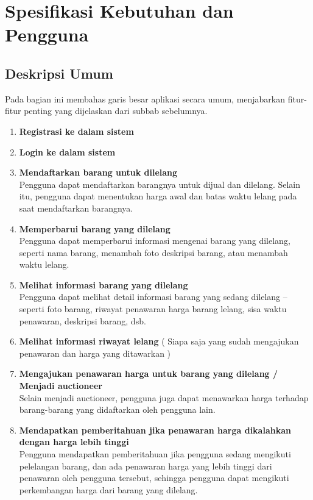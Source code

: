 \section{Spesifikasi Kebutuhan dan Pengguna}
   
  \subsection{Deskripsi Umum}
  
  Pada bagian ini membahas garis besar aplikasi secara umum, menjabarkan fitur-fitur penting yang dijelaskan dari subbab sebelumnya.  
  \begin{enumerate}
  \item \textbf{Registrasi ke dalam sistem}
    \item \textbf{Login ke dalam sistem}
    \item \textbf{Mendaftarkan barang untuk dilelang} \\
        Pengguna dapat mendaftarkan barangnya untuk dijual dan dilelang. Selain itu, pengguna dapat menentukan harga awal dan batas waktu lelang pada saat mendaftarkan barangnya.
    \item \textbf{Memperbarui barang yang dilelang} \\
        Pengguna dapat memperbarui informasi mengenai barang yang dilelang, seperti nama barang, menambah foto deskripsi barang, atau menambah waktu lelang.
    \item \textbf{Melihat informasi barang yang dilelang} \\
        Pengguna dapat melihat detail informasi barang yang sedang dilelang – seperti foto barang, riwayat penawaran harga barang lelang, sisa waktu penawaran, deskripsi barang, dsb.
    \item \textbf{Melihat informasi riwayat lelang} ( Siapa saja yang sudah mengajukan penawaran dan harga yang ditawarkan )
    \item \textbf{Mengajukan penawaran harga untuk barang yang dilelang / Menjadi auctioneer} \\
        Selain menjadi auctioneer, pengguna juga dapat menawarkan harga terhadap barang-barang yang didaftarkan oleh pengguna lain.
    \item \textbf{Mendapatkan pemberitahuan jika penawaran harga dikalahkan dengan harga lebih tinggi} \\
        Pengguna mendapatkan pemberitahuan jika pengguna sedang mengikuti pelelangan barang, dan ada penawaran harga yang lebih tinggi dari penawaran oleh pengguna tersebut, sehingga pengguna dapat mengikuti perkembangan harga dari barang yang dilelang.

\end{enumerate}
